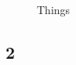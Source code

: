 \documentclass[10pt]{article}\usepackage[]{graphicx}\usepackage[]{color}
\theoremstyle{plain}
\begin{document}
\begin{multicols*}{2}
\begin{Schunk}
\begin{figure}[H]
{}

\caption[Things]{Things}\label{fig:nullclines}
\end{figure}
\end{Schunk}




\subsection*{2}

\end{multicols*}
\end{document}
